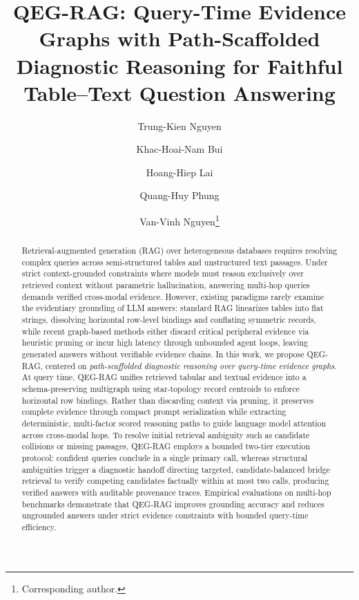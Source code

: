 \documentclass[runningheads]{llncs}
\begin{document}
\title{QEG-RAG: Query-Time Evidence Graphs with Path-Scaffolded Diagnostic Reasoning for Faithful Table--Text Question Answering}
\author{Trung-Kien Nguyen \and
Khac-Hoai-Nam Bui \and
Hoang-Hiep Lai \and
Quang-Huy Phung \and
Van-Vinh Nguyen\thanks{Corresponding author.}}
%
%
\maketitle

\begin{abstract}
Retrieval-augmented generation (RAG) over heterogeneous databases requires resolving complex queries across semi-structured tables and unstructured text passages. Under strict context-grounded constraints where models must reason exclusively over retrieved context without parametric hallucination, answering multi-hop queries demands verified cross-modal evidence. However, existing paradigms rarely examine the evidentiary grounding of LLM answers: standard RAG linearizes tables into flat strings, dissolving horizontal row-level bindings and conflating symmetric records, while recent graph-based methods either discard critical peripheral evidence via heuristic pruning or incur high latency through unbounded agent loops, leaving generated answers without verifiable evidence chains. In this work, we propose QEG-RAG, centered on \emph{path-scaffolded diagnostic reasoning over query-time evidence graphs}. At query time, QEG-RAG unifies retrieved tabular and textual evidence into a schema-preserving multigraph using star-topology record centroids to enforce horizontal row bindings. Rather than discarding context via pruning, it preserves complete evidence through compact prompt serialization while extracting deterministic, multi-factor scored reasoning paths to guide language model attention across cross-modal hops. To resolve initial retrieval ambiguity such as candidate collisions or missing passages, QEG-RAG employs a bounded two-tier execution protocol: confident queries conclude in a single primary call, whereas structural ambiguities trigger a diagnostic handoff directing targeted, candidate-balanced bridge retrieval to verify competing candidates factually within at most two calls, producing verified answers with auditable provenance traces. Empirical evaluations on multi-hop benchmarks demonstrate that QEG-RAG improves grounding accuracy and reduces ungrounded answers under strict evidence constraints with bounded query-time efficiency.

\end{abstract}
\end{document}
